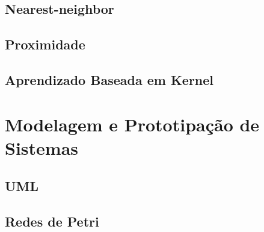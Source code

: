     \subsection{Nearest-neighbor}
    \subsection{Proximidade}
    \subsection{Aprendizado Baseada em Kernel}
\section{Modelagem e Prototipação de Sistemas}
    \subsection{UML}
    \subsection{Redes de Petri}
